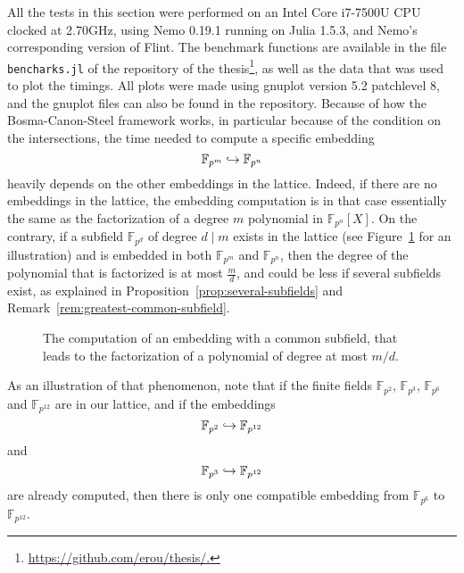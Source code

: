 All the tests in this section were performed on an Intel Core i7-7500U CPU
clocked at 2.70GHz, using Nemo 0.19.1 running on Julia 1.5.3, and
Nemo’s corresponding version of Flint. The benchmark functions are available in the
file \texttt{bencharks.jl} of the repository of the
thesis\footnote{\url{https://github.com/erou/thesis/.}}, as well as the data
that was used to plot the timings. All plots were made using gnuplot version 5.2
patchlevel 8, and the gnuplot files can also be found in the repository. Because
of how the Bosma-Canon-Steel framework works, in particular because of the
condition on the intersections, the time needed to compute a specific embedding
\[
  \mathbb{F}_{p^{m}}\hookrightarrow\mathbb{F}_{p^{n}}
\]
heavily depends on the other embeddings in the lattice. Indeed, if there are no
embeddings in the lattice, the embedding computation is in that case essentially
the same as the factorization of a degree $m$ polynomial in
$\mathbb{F}_{p^{n}}[X]$. On the contrary, if a subfield
$\mathbb{F}_{p^{d}}$ of degree $d\mid m$ exists in the lattice (see
Figure~\ref{fig:illustration-common-subfield} for an illustration) and is embedded
in both $\mathbb{F}_{p^{m}}$ and $\mathbb{F}_{p^{n}}$, then the degree of the
polynomial that is factorized is at most $\frac{m}{d}$, and could be less if
several subfields exist, as explained in
Proposition~\ref{prop:several-subfields} and
Remark~\ref{rem:greatest-common-subfield}.
\begin{figure}[h]
  \label{fig:illustration-common-subfield}
  \centering
  \caption{The computation of an embedding with a common subfield, that leads to
  the factorization of a polynomial of degree at most $m/d$.}
\end{figure}
As an illustration of that phenomenon, note that if the finite fields
$\mathbb{F}_{p^{2}}$, $\mathbb{F}_{p^{3}}$, $\mathbb{F}_{p^{6}}$ and
$\mathbb{F}_{p^{12}}$ are in our lattice, and if the embeddings
\[
  \mathbb{F}_{p^{2}}\hookrightarrow \mathbb{F}_{p^{12}}
\]
and
\[
  \mathbb{F}_{p^{3}}\hookrightarrow \mathbb{F}_{p^{12}}
\]
are already computed, then there is only one compatible embedding from
$\mathbb{F}_{p^{6}}$ to $\mathbb{F}_{p^{12}}$.
